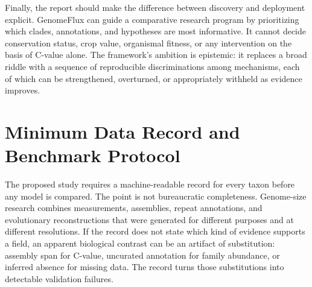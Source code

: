 \documentclass[conference]{IEEEtran}
\begin{document}
Finally, the report should make the difference between discovery and deployment explicit. GenomeFlux can guide a comparative research program by prioritizing which clades, annotations, and hypotheses are most informative. It cannot decide conservation status, crop value, organismal fitness, or any intervention on the basis of C-value alone. The framework's ambition is epistemic: it replaces a broad riddle with a sequence of reproducible discriminations among mechanisms, each of which can be strengthened, overturned, or appropriately withheld as evidence improves.

\section{Minimum Data Record and Benchmark Protocol}

The proposed study requires a machine-readable record for every taxon before any model is compared. The point is not bureaucratic completeness. Genome-size research combines measurements, assemblies, repeat annotations, and evolutionary reconstructions that were generated for different purposes and at different resolutions. If the record does not state which kind of evidence supports a field, an apparent biological contrast can be an artifact of substitution: assembly span for C-value, uncurated annotation for family abundance, or inferred absence for missing data. The record turns those substitutions into detectable validation failures.
\end{document}
